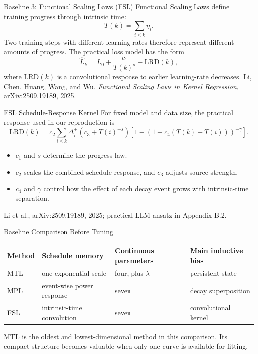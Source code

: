 \documentclass[aspectratio=169]{beamer}
\newcommand{\source}[1]{\vfill{\tiny\color{sourcegray}#1}}
\begin{document}
\begin{frame}{Baseline 3: Functional Scaling Laws (FSL)}
  Functional Scaling Laws define training progress through intrinsic time:
  \[
    T(k)=\sum_{i\leq k}\eta_i .
  \]
  Two training steps with different learning rates therefore represent different amounts of progress. The practical loss model has the form
  \[
    \widehat L_k=L_0+\frac{c_1}{T(k)^s}-\mathrm{LRD}(k),
  \]
  where \(\mathrm{LRD}(k)\) is a convolutional response to earlier learning-rate decreases.
  \source{Li, Chen, Huang, Wang, and Wu, \emph{Functional Scaling Laws in Kernel Regression}, arXiv:2509.19189, 2025.}
\end{frame}

\begin{frame}{FSL Schedule-Response Kernel}
  For fixed model and data size, the practical response used in our reproduction is
  \[
  \mathrm{LRD}(k)=
  c_2\sum_{i\leq k}\Delta_i^+
  \left(c_3+T(i)^{-s}\right)
  \left[
    1-\left(1+c_4(T(k)-T(i))\right)^{-\gamma}
  \right].
  \]
  \begin{itemize}
    \item \(c_1\) and \(s\) determine the progress law.
    \item \(c_2\) scales the combined schedule response, and \(c_3\) adjusts source strength.
    \item \(c_4\) and \(\gamma\) control how the effect of each decay event grows with intrinsic-time separation.
  \end{itemize}
  \source{Li et al., arXiv:2509.19189, 2025; practical LLM ansatz in Appendix B.2.}
\end{frame}

\begin{frame}{Baseline Comparison Before Tuning}
  \begin{center}
  \small
  \begin{tabular}{llll}
    \toprule
    Method & Schedule memory & Continuous parameters & Main inductive bias \\
    \midrule
    MTL & one exponential scale & four, plus \(\lambda\) & persistent state \\
    MPL & event-wise power response & seven & decay superposition \\
    FSL & intrinsic-time convolution & seven & convolutional kernel \\
    \bottomrule
  \end{tabular}
  \end{center}
  MTL is the oldest and lowest-dimensional method in this comparison. Its compact structure becomes valuable when only one curve is available for fitting.
\end{frame}
\end{document}
